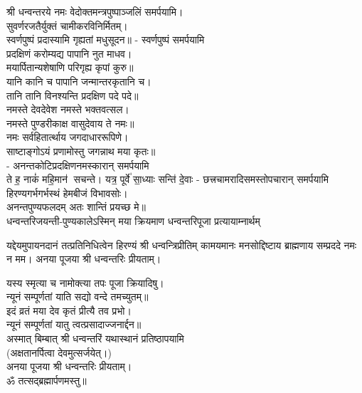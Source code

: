 श्री धन्वन्तरये नमः वेदोक्तमन्त्रपुष्पाञ्जलिं समर्पयामि।\\

सुवर्णरजतैर्युक्तं चामीकरविनिर्मितम्।\\
स्वर्णपुष्पं प्रदास्यामि गृह्यतां मधुसूदन॥ - स्वर्णपुष्पं समर्पयामि\\
 
प्रदक्षिणं करोम्यद्य पापानि नुत माधव।\\
मयार्पितान्यशेषाणि परिगृह्य कृपां कुरु॥\\
 यानि कानि च पापानि जन्मान्तरकृतानि च।\\
तानि तानि विनश्यन्ति प्रदक्षिण पदे पदे॥\\
 
नमस्ते देवदेवेश नमस्ते भक्तवत्सल।\\
नमस्ते पुण्डरीकाक्ष वासुदेवाय ते नमः॥\\
नमः सर्वहितार्त्थाय जगदाधाररूपिणे।\\
साष्टाङ्गोऽयं प्रणामोस्तु जगन्नाथ मया कृतः॥\\
- अनन्तकोटिप्रदक्षिणनमस्कारान् समर्पयामि\\

{ते ह॒ नाकं॑ महि॒मान॑ सचन्ते। यत्र॒ पूर्वे॑ सा॒ध्याः सन्ति॑ दे॒वाः}
- छत्त्रचामरादिसमस्तोपचारान् समर्पयामि\\

हिरण्यगर्भगर्भस्थं हेमबीजं विभावसोः।\\
अनन्तपुण्यफलदम् अतः शान्तिं प्रयच्छ मे॥\\

धन्वन्तरिजयन्ती-पुण्यकालेऽस्मिन् मया क्रियमाण धन्वन्तरिपूजा प्रत्यायाम्नार्थम्

यद्देयमुपायनदानं तत्प्रतिनिधित्वेन हिरण्यं श्री धन्वन्त्रिप्रीतिम् 
कामयमानः मनसोद्दिष्टाय ब्राह्मणाय सम्प्रददे नमः न मम। 
अनया पूजया श्री धन्वन्तरिः प्रीयताम्। 
 
 यस्य स्मृत्या च नामोक्त्या तपः पूजा क्रियादिषु।\\
न्यूनं सम्पूर्णतां याति सद्यो वन्दे तमच्युतम्॥ \\
इदं व्रतं मया देव कृतं प्रीत्यै तव प्रभो।\\
न्यूनं सम्पूर्णतां यातु त्वत्प्रसादाज्जनार्द्दन॥\\
 
अस्मात् बिम्बात् श्री धन्वन्तरिं यथास्थानं प्रतिष्ठापयामि\\
(अक्षतानर्पित्वा देवमुत्सर्जयेत्।)\\
अनया पूजया श्री धन्वन्तरिः प्रीयताम्। \\
ॐ तत्सद्ब्रह्मार्पणमस्तु॥